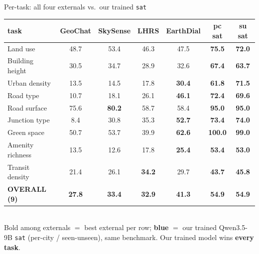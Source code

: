 \documentclass[aspectratio=169]{beamer}
\newcommand{\best}[1]{\textbf{#1}}
\begin{document}
\begin{frame}{Per-task: all four externals vs.\ our trained \texttt{sat}}
\centering\scriptsize
\begin{tabular}{lcccc>{\columncolor{ours!12}}c>{\columncolor{ours!12}}c}
\toprule
task & GeoChat & SkySense & LHRS & EarthDial & \textbf{pc sat} & \textbf{su sat} \\
\midrule
Land use         & 48.7 & 53.4 & 46.3 & 47.5 & \textbf{75.5} & \textbf{72.0} \\
Building height  & 30.5 & 34.7 & 28.9 & 32.6 & \textbf{67.4} & \textbf{63.7} \\
Urban density    & 13.5 & 14.5 & 17.8 & \best{30.4} & \textbf{61.8} & \textbf{71.5} \\
Road type        & 10.7 & 18.1 & 26.1 & \best{46.1} & \textbf{72.4} & \textbf{69.6} \\
Road surface     & 75.6 & \best{80.2} & 58.7 & 58.4 & \textbf{95.0} & \textbf{95.0} \\
Junction type    &  8.4 & 30.8 & 35.3 & \best{52.7} & \textbf{73.4} & \textbf{74.0} \\
Green space      & 50.7 & 53.7 & 39.9 & \best{62.6} & \textbf{100.0} & \textbf{99.0} \\
Amenity richness & 13.5 & 12.6 & 17.8 & \best{25.4} & \textbf{53.4} & \textbf{53.0} \\
Transit density  & 21.4 & 26.1 & \best{34.2} & 29.7 & \textbf{43.7} & \textbf{45.8} \\
\midrule
\textbf{OVERALL (9)} & \textbf{27.8} & \textbf{33.4} & \textbf{32.9} & \best{\textbf{41.3}} & \textbf{54.9} & \textbf{54.9} \\
\bottomrule
\end{tabular}\\[6pt]
\footnotesize Bold among externals $=$ best external per row; \textbf{blue} $=$ our trained
Qwen3.5-9B \texttt{sat} (per-city / seen-unseen), same benchmark. Our trained model wins
\textbf{every task}.
\end{frame}
\end{document}
